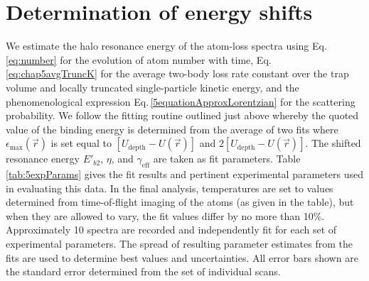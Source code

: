 \section{Determination of energy shifts} \label{sec:lowE_Eb2}
We estimate the halo resonance energy of the atom-loss spectra using Eq.\,\ref{eq:number} for the evolution of atom number with time, Eq.\,\ref{eq:chap5avgTruncK} for the average two-body loss rate constant over the trap volume and locally truncated single-particle kinetic energy, and the phenomenological expression Eq.\,\ref{5equationApproxLorentzian} for the scattering probability.
We follow the fitting routine outlined just above whereby the quoted value of the binding energy is determined from the average of two fits where $\epsilon_{\text{max}}(\vec{r})$ is set equal to $[U_{\text{depth}}-U(\vec{r})]$ and $2[U_{\text{depth}}-U(\vec{r})]$.
The shifted resonance energy $E'_{b2}$, $\eta$, and $\gamma_{\text{eff}}$ are taken as fit parameters.
Table \ref{tab:5expParams} gives the fit results and pertinent experimental parameters used in evaluating this data.
In the final analysis, temperatures are set to values determined from time-of-flight imaging of the atoms (as given in the table), but when they are allowed to vary, the fit values differ by no more than 10\%.
Approximately 10 spectra are recorded and independently fit for each set of experimental parameters.
The spread of resulting parameter estimates from the fits are used to determine best values and uncertainties.
All error bars shown are the standard error determined from the set of individual scans.
